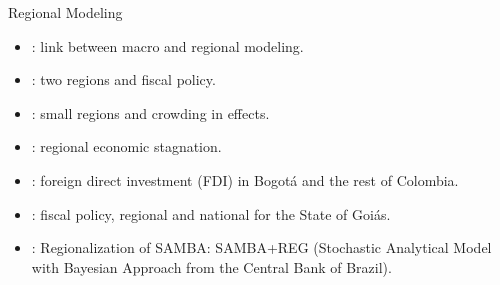 \documentclass[../quali_slides.tex]{subfiles}
\begin{document}
\begin{frame}[fragile]{Regional Modeling}

\begin{itemize}

	\item \textcite{rickman_modern_2010}: link between macro and regional modeling.

	\item \textcite{tamegawa_two-region_2012}: two regions and fiscal policy.

	\item \textcite{tamegawa_constructing_2013}: small regions and crowding in effects.
	
	\item \textcite{okano_development_2015}: regional economic stagnation.

	\item \textcite{mora_fdi_2019}: foreign direct investment (FDI) in Bogotá and the rest of Colombia.

	\item \textcite{costa_junior_dsge_2022}: fiscal policy, regional and national for the State of Goiás.
	
	\item \textcite{osterno_uma_2022}: Regionalization of SAMBA: SAMBA+REG (Stochastic Analytical Model with Bayesian Approach from the Central Bank of Brazil).
	
\end{itemize}
		
\end{frame}
\end{document}
